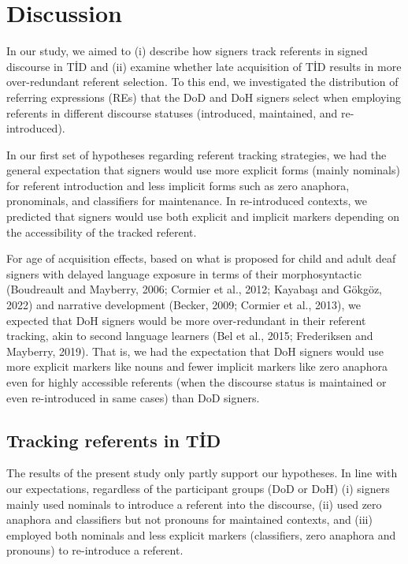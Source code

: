 \documentclass[]{elsarticle} %
\begin{document}
\hypertarget{discussion}{%
\section{Discussion}\label{discussion}}

In our study, we aimed to (i) describe how signers track referents in
signed discourse in TİD and (ii) examine whether late acquisition of TİD
results in more over-redundant referent selection. To this end, we
investigated the distribution of referring expressions (REs) that the
DoD and DoH signers select when employing referents in different
discourse statuses (introduced, maintained, and re-introduced).

In our first set of hypotheses regarding referent tracking strategies,
we had the general expectation that signers would use more explicit
forms (mainly nominals) for referent introduction and less implicit
forms such as zero anaphora, pronominals, and classifiers for
maintenance. In re-introduced contexts, we predicted that signers would
use both explicit and implicit markers depending on the accessibility of
the tracked referent.

For age of acquisition effects, based on what is proposed for child and
adult deaf signers with delayed language exposure in terms of their
morphosyntactic (Boudreault and Mayberry, 2006; Cormier et al., 2012;
Kayabaşı and Gökgöz, 2022) and narrative development (Becker, 2009;
Cormier et al., 2013), we expected that DoH signers would be more
over-redundant in their referent tracking, akin to second language
learners (Bel et al., 2015; Frederiksen and Mayberry, 2019). That is, we
had the expectation that DoH signers would use more explicit markers
like nouns and fewer implicit markers like zero anaphora even for highly
accessible referents (when the discourse status is maintained or even
re-introduced in same cases) than DoD signers.

\hypertarget{tracking-referents-in-tid}{%
\subsection{Tracking referents in TİD}\label{tracking-referents-in-tid}}

The results of the present study only partly support our hypotheses. In
line with our expectations, regardless of the participant groups (DoD or
DoH) (i) signers mainly used nominals to introduce a referent into the
discourse, (ii) used zero anaphora and classifiers but not pronouns for
maintained contexts, and (iii) employed both nominals and less explicit
markers (classifiers, zero anaphora and pronouns) to re-introduce a
referent.
\end{document}
